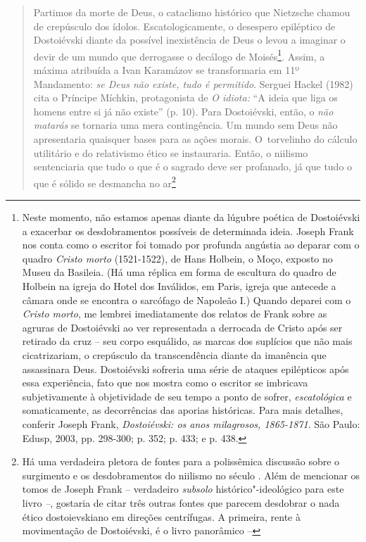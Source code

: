 {\begin{quote}
Partimos da morte de Deus, o cataclismo histórico que Nietzsche chamou
de crepúsculo dos ídolos. Escatologicamente, o desespero epiléptico de
Dostoiévski diante da possível inexistência de Deus o levou a imaginar o
devir de um mundo que derrogasse o decálogo de Moisés\footnote{Neste
  momento, não estamos apenas diante da lúgubre poética de Dostoiévski a
  exacerbar os desdobramentos possíveis de determinada ideia. Joseph
  Frank nos conta como o escritor foi tomado por profunda angústia ao
  deparar com o quadro \emph{Cristo morto} (1521-1522), de Hans Holbein,
  o Moço, exposto no Museu da Basileia. (Há uma réplica em forma de
  escultura do quadro de Holbein na igreja do Hotel dos Inválidos, em
  Paris, igreja que antecede a câmara onde se encontra o sarcófago de
  Napoleão I.) Quando deparei com o \emph{Cristo morto}, me lembrei
  imediatamente dos relatos de Frank sobre as agruras de Dostoiévski ao
  ver representada a derrocada de Cristo após ser retirado da cruz --
  seu corpo esquálido, as marcas dos suplícios que não mais
  cicatrizariam, o crepúsculo da transcendência diante da imanência que
  assassinara Deus. Dostoiévski sofreria uma série de ataques
  epilépticos após essa experiência, fato que nos mostra como o escritor
  se imbricava subjetivamente à objetividade de seu tempo a ponto de
  sofrer, \emph{escatológica} e somaticamente, as decorrências das
  aporias históricas. Para mais detalhes, conferir Joseph Frank,
  \emph{Dostoiévski: os anos milagrosos, 1865-1871}. São Paulo: Edusp,
  2003, pp. 298-300; p. 352; p. 433; e p. 438.}. Assim, a máxima
atribuída a Ivan Karamázov se transformaria em 11º Mandamento: \emph{se
Deus não existe, tudo é permitido}. Serguei Hackel (1982) cita o
Príncipe Míchkin, protagonista de \emph{O idiota:} ``A ideia que liga os
homens entre si já não existe'' (p. 10). Para Dostoiévski, então, o
\emph{não matarás} se tornaria uma mera contingência. Um mundo sem Deus
não apresentaria quaisquer bases para as ações morais. O~torvelinho do
cálculo utilitário e do relativismo ético se instauraria. Então, o
niilismo sentenciaria que tudo o que é o sagrado deve ser profanado, já
que tudo o que é sólido se desmancha no ar\footnote{Há uma verdadeira
  pletora de fontes para a polissêmica discussão sobre o surgimento e os
  desdobramentos do niilismo no século . Além de mencionar os tomos
  de Joseph Frank -- verdadeiro \emph{subsolo} histórico"-ideológico para
  este livro \emph{--}, gostaria de citar três outras fontes que parecem
  desdobrar o nada ético dostoievskiano em direções centrífugas. A
  primeira, rente à movimentação de Dostoiévski, é o livro panorâmico --
}
\end{quote}}
